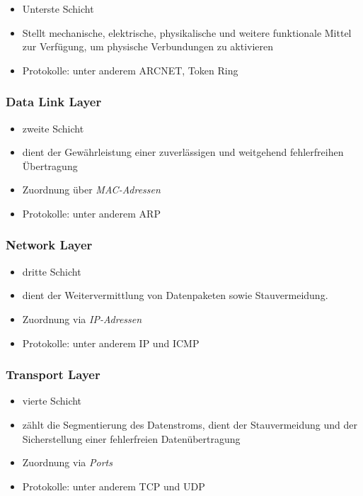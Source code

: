 \documentclass[a4paper, 12pt]{report}
\begin{document}
\begin{itemize}
    \item Unterste Schicht
    \item Stellt mechanische, elektrische, physikalische und weitere funktionale 
    Mittel zur Verfügung, um physische Verbundungen zu aktivieren
    \item Protokolle: unter anderem ARCNET, Token Ring
\end{itemize}

\subsubsection{Data Link Layer}

\begin{itemize}
    \item zweite Schicht
    \item dient der Gewährleistung einer zuverlässigen und weitgehend 
        fehlerfreihen Übertragung
    \item Zuordnung über \emph{MAC-Adressen}
    \item Protokolle: unter anderem ARP
\end{itemize}

\subsubsection{Network Layer}

\begin{itemize}
    \item dritte Schicht
    \item dient der Weitervermittlung von Datenpaketen sowie Stauvermeidung. 
    \item Zuordnung via \emph{IP-Adressen}
    \item Protokolle: unter anderem IP und ICMP
\end{itemize}

\subsubsection{Transport Layer}

\begin{itemize}
    \item vierte Schicht
    \item zählt die Segmentierung des Datenstroms, dient der Stauvermeidung und 
        der Sicherstellung einer fehlerfreien Datenübertragung
    \item Zuordnung via \emph{Ports}
    \item Protokolle: unter anderem TCP und UDP
\end{itemize}
\end{document}

